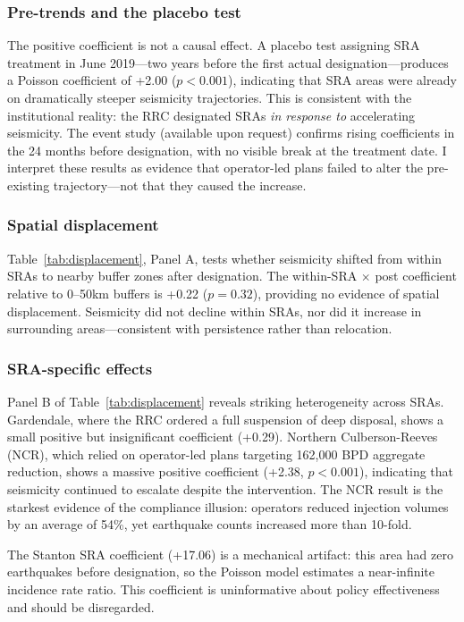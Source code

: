 \documentclass[12pt]{article}
\begin{document}
\subsubsection*{Pre-trends and the placebo test} The positive coefficient is not a causal effect. A placebo test assigning SRA treatment in June 2019---two years before the first actual designation---produces a Poisson coefficient of +2.00 ($p < 0.001$), indicating that SRA areas were already on dramatically steeper seismicity trajectories. This is consistent with the institutional reality: the RRC designated SRAs \textit{in response to} accelerating seismicity. The event study (available upon request) confirms rising coefficients in the 24 months before designation, with no visible break at the treatment date. I interpret these results as evidence that operator-led plans failed to alter the pre-existing trajectory---not that they caused the increase.

\subsubsection*{Spatial displacement} Table~\ref{tab:displacement}, Panel A, tests whether seismicity shifted from within SRAs to nearby buffer zones after designation. The within-SRA $\times$ post coefficient relative to 0--50km buffers is +0.22 ($p = 0.32$), providing no evidence of spatial displacement. Seismicity did not decline within SRAs, nor did it increase in surrounding areas---consistent with persistence rather than relocation.



\subsubsection*{SRA-specific effects} Panel B of Table~\ref{tab:displacement} reveals striking heterogeneity across SRAs. Gardendale, where the RRC ordered a full suspension of deep disposal, shows a small positive but insignificant coefficient (+0.29). Northern Culberson-Reeves (NCR), which relied on operator-led plans targeting 162,000 BPD aggregate reduction, shows a massive positive coefficient (+2.38, $p < 0.001$), indicating that seismicity continued to escalate despite the intervention. The NCR result is the starkest evidence of the compliance illusion: operators reduced injection volumes by an average of 54\%, yet earthquake counts increased more than 10-fold.

The Stanton SRA coefficient (+17.06) is a mechanical artifact: this area had zero earthquakes before designation, so the Poisson model estimates a near-infinite incidence rate ratio. This coefficient is uninformative about policy effectiveness and should be disregarded.
\end{document}
